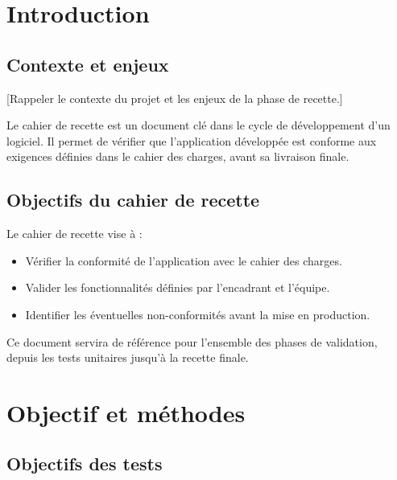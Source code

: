 \documentclass[12pt, a4paper]{article}
\begin{document}
\makecoverpage
\makesommaire

\section{Introduction}

\subsection{Contexte et enjeux}

[Rappeler le contexte du projet et les enjeux de la phase de recette.]

Le cahier de recette est un document clé dans le cycle de développement d'un
logiciel. Il permet de vérifier que l'application développée est conforme aux
exigences définies dans le cahier des charges, avant sa livraison finale.

\subsection{Objectifs du cahier de recette}

Le cahier de recette vise à :
\begin{itemize}
  \item Vérifier la conformité de l'application avec le cahier des charges.
  \item Valider les fonctionnalités définies par l'encadrant et l'équipe.
  \item Identifier les éventuelles non-conformités avant la mise en production.
\end{itemize}

Ce document servira de référence pour l'ensemble des phases de validation,
depuis les tests unitaires jusqu'à la recette finale.

\section{Objectif et méthodes}

\subsection{Objectifs des tests}
\end{document}
